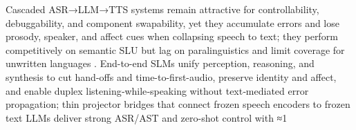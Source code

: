 \documentclass{article}
\begin{document}
Cascaded ASR→LLM→TTS systems remain attractive for controllability, debuggability, and component swapability, yet they accumulate errors and lose prosody, speaker, and affect cues when collapsing speech to text; they perform competitively on semantic SLU but lag on paralinguistics and limit coverage for unwritten languages \cite{huang2023holisticcascadesystembenchmarkhumanevalu,huang2025dynamicsuperbphase2collaborativelyexpand}. End-to-end SLMs unify perception, reasoning, and synthesis to cut hand-offs and time-to-first-audio, preserve identity and affect, and enable duplex listening‑while‑speaking without text‑mediated error propagation; thin projector bridges that connect frozen speech encoders to frozen text LLMs deliver strong ASR/AST and zero-shot control with ≈1%

\end{document}

